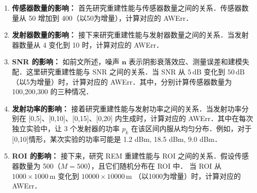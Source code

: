 \documentclass[a4paper,zihao=-4]{ctexart}
\renewcommand{\mathbf}[1]{\symbf{#1}}
\begin{document}
\begin{enumerate}
    \item \textbf{传感器数量的影响：}
    首先研究重建性能与传感器数量之间的关系．传感器数量从 50 增加到 400（以50为增量），计算对应的 AWErr．


    \item \textbf{发射器数量的影响：}
    接下来研究重建性能与发射器数量之间的关系．当发射器数量从 4 变化到 10 时，计算对应的 AWErr．


    \item \textbf{SNR 的影响：}
如前文所述，噪声 $\mathbf{n}$ 表示阴影衰落效应、测量误差和建模失配．这里研究重建性能与 SNR 之间的关系．当 SNR 从 $5\,\mathrm{dB}$ 变化到 $50\,\mathrm{dB}$ （以5为增量）时，计算对应的 AWErr．其中，分别计算传感器数量为 100,200,300 的三种情况．

    \item \textbf{发射功率的影响：}
    接着研究重建性能与发射功率之间的关系．当发射功率分别在 [0,5]、[0,10]、[0,15]、[0,20] 内生成时，计算对应的 AWErr．其中在每次独立实验中，让 3 个发射器的功率 $p_k$ 在该区间内服从均匀分布．例如，对于[0,10]情形，某次实验的功率可能是 {1.2 dBm, 18.5 dBm, 9.0 dBm}．

    \item \textbf{ROI 的影响：}
    接下来，研究 REM 重建性能与 ROI 之间的关系．假设传感器数量为 500（$M = 500$），且它们随机分布在 ROI 中．
    当 ROI 从 $1000 \times 1000\,\mathrm{m}$ 变化到 $10000 \times 10000\,\mathrm{m}$ （以1000为增量）时，计算对应的 AWErr．


\end{enumerate}
\end{document}
